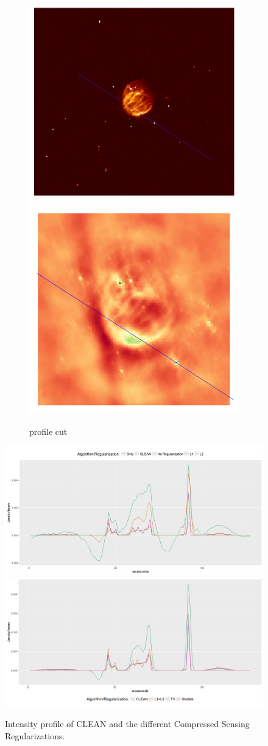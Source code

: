 \begin{figure}
	\centering
	\begin{subfigure}[b]{0.9\linewidth}
		\centering
		\includegraphics[width=0.3\linewidth, trim={180px 170px 170px 146px}, clip]{./chapters/05.results/pic_G55_7_lined.png}
		\includegraphics[width=0.3\linewidth, trim={18px 19px 18px 18px}, clip]{./chapters/05.results/raw_image_lined.png}
		\caption{profile cut}
	\end{subfigure}

	\includegraphics[width=\linewidth, clip]{./chapters/05.results/df1.png}
	\includegraphics[width=\linewidth, clip]{./chapters/05.results/df2.png}
	\caption{Intensity profile of CLEAN and the different Compressed Sensing Regularizations.}
	\label{res:g55:profile}
\end{figure}

